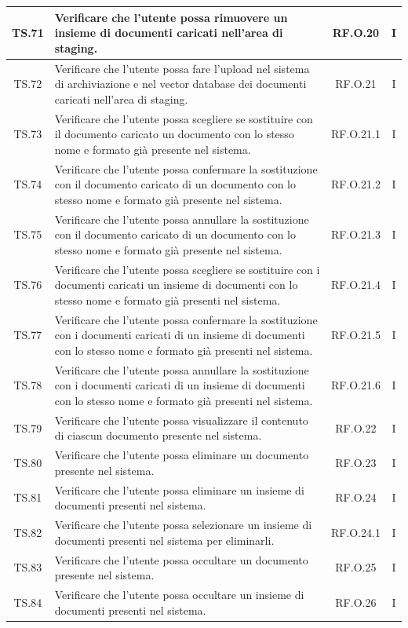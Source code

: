 \documentclass[10pt, a4paper]{article}
\begin{document}
\begin{xltabular}{\textwidth}{|c|X|c|c|}
\hline
TS.71 & Verificare che l'utente possa rimuovere un insieme di documenti caricati nell’area di staging. & RF.O.20 & I \\
\hline
TS.72 & Verificare che l'utente possa fare l’upload nel sistema di archiviazione e nel vector database dei documenti caricati nell’area di staging. & RF.O.21 & I \\
\hline
TS.73 & Verificare che l'utente possa scegliere se sostituire con il documento caricato un documento con lo stesso nome e formato già presente nel sistema. & RF.O.21.1 & I \\
\hline
TS.74 & Verificare che l'utente possa confermare la sostituzione con il documento caricato di un documento con lo stesso nome e formato già presente nel sistema. & RF.O.21.2 & I \\
\hline
TS.75 & Verificare che l'utente possa annullare la sostituzione con il documento caricato di un documento con lo stesso nome e formato già presente nel sistema. & RF.O.21.3 & I \\
\hline
TS.76 & Verificare che l'utente possa scegliere se sostituire con i documenti caricati un insieme di documenti con lo stesso nome e formato già presenti nel sistema. & RF.O.21.4 & I \\
\hline
TS.77 & Verificare che l'utente possa confermare la sostituzione con i documenti caricati di un insieme di documenti con lo stesso nome e formato già presenti nel sistema. & RF.O.21.5 & I \\
\hline
TS.78 & Verificare che l'utente possa annullare la sostituzione con i documenti caricati di un insieme di documenti con lo stesso nome e formato già presenti nel sistema. & RF.O.21.6 & I \\
\hline
TS.79 & Verificare che l'utente possa visualizzare il contenuto di ciascun documento presente nel sistema. & RF.O.22 & I \\
\hline
TS.80 & Verificare che l'utente possa eliminare un documento presente nel sistema. & RF.O.23 & I \\
\hline
TS.81 & Verificare che l'utente possa eliminare un insieme di documenti presenti nel sistema. & RF.O.24 & I \\
\hline
TS.82 & Verificare che l'utente possa selezionare un insieme di documenti presenti nel sistema per eliminarli. & RF.O.24.1 & I \\
\hline
TS.83 & Verificare che l'utente possa occultare un documento presente nel sistema. & RF.O.25 & I \\
\hline
TS.84 & Verificare che l'utente possa occultare un insieme di documenti presenti nel sistema. & RF.O.26 & I \\

\end{xltabular}
\end{document}
